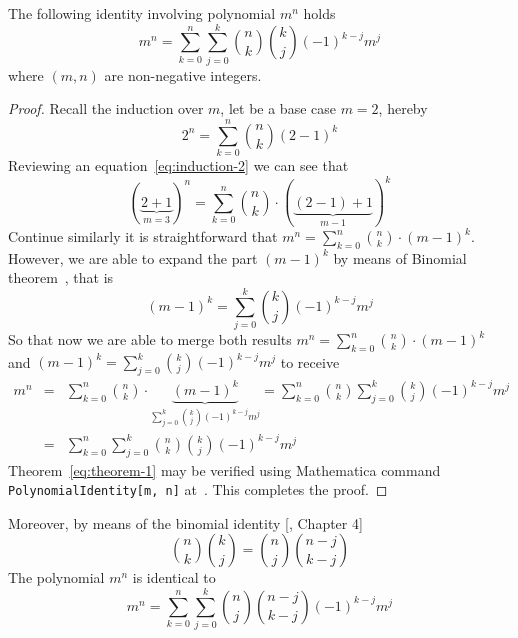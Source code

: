 \begin{thm}
    The following identity involving polynomial $m^n$ holds
    \begin{equation}
        m^n=\sum_{k=0}^{n}\sum_{j=0}^{k}\binom{n}{k}\binom{k}{j}(-1)^{k-j}m^j\label{eq:theorem-1}
    \end{equation}
    where $(m, n)$ are non-negative integers.
    \begin{proof}
        Recall the induction over $m$, let be a base case $m=2$, hereby
        \begin{equation}
            2^n=\sum_{k=0}^{n}\binom{n}{k}(2-1)^k\label{eq:induction-2}
        \end{equation}
        Reviewing an equation~\eqref{eq:induction-2} we can see that
        \begin{equation}
        (\underbrace{2+1}_{m=3})
            ^n=\sum_{k=0}^{n}\binom{n}{k}\cdot (\underbrace{(2-1)+1}_{m-1})^k\label{eq:induction-3}
        \end{equation}
        Continue similarly it is straightforward that $m^n = \sum_{k=0}^{n}\binom{n}{k} \cdot (m-1)^k$.
        However, we are able to expand the part $(m-1)^k$ by means of Binomial theorem~\cite{AbraSteg72}, that is
        \[
            (m-1)^k = \sum_{j=0}^{k} \binom{k}{j} (-1)^{k-j} m^j
        \]
        So that now we are able to merge both results $m^n = \sum_{k=0}^{n}\binom{n}{k} \cdot (m-1)^k$
        and $(m-1)^k = \sum_{j=0}^{k} \binom{k}{j} (-1)^{k-j} m^j$ to receive
        \begin{align*}
            \label{hyp8}
            m^n
            &=& \sum_{k=0}^{n} \binom{n}{k} \cdot \underbrace{(m-1)^k}_{\sum_{j=0}^{k} \binom{k}{j} (-1)^{k-j} m^j}
            =\sum_{k=0}^{n} \binom{n}{k} \sum_{j=0}^{k} \binom{k}{j} (-1)^{k-j} m^j\\
            &=& \sum_{k=0}^{n} \sum_{j=0}^{k} \binom{n}{k} \binom{k}{j} (-1)^{k-j} m^j
        \end{align*}
        Theorem~\eqref{eq:theorem-1} may be verified using Mathematica command \texttt{PolynomialIdentity[m, n]}
        at~\cite{PK22Source}.
        This completes the proof.
    \end{proof}
\end{thm}
Moreover, by means of the binomial identity [\cite{gross2016combinatorial}, Chapter 4]
\[
    \binom{n}{k} \binom{k}{j} = \binom{n}{j} \binom{n-j}{k-j}
\]
The polynomial $m^n$ is identical to
\[
    m^n = \sum_{k=0}^{n} \sum_{j=0}^{k} \binom{n}{j} \binom{n-j}{k-j} (-1)^{k-j} m^j
\]